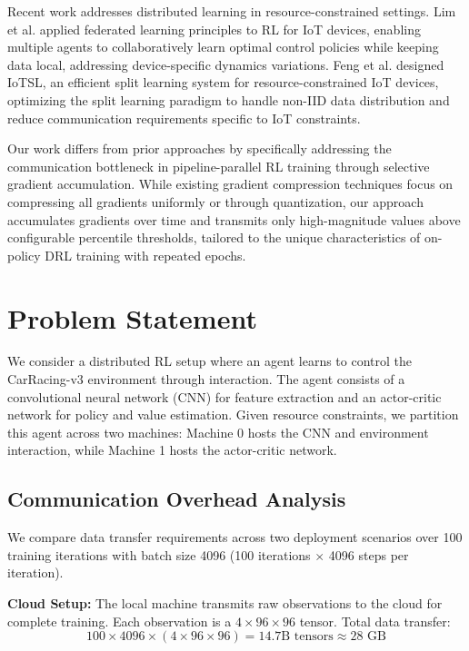 \documentclass[conference]{IEEEtran}
\begin{document}
Recent work addresses distributed learning in resource-constrained settings. Lim et al. \cite{lim2020} applied federated learning principles to RL for IoT devices, enabling multiple agents to collaboratively learn optimal control policies while keeping data local, addressing device-specific dynamics variations. Feng et al. \cite{feng2023} designed IoTSL, an efficient split learning system for resource-constrained IoT devices, optimizing the split learning paradigm to handle non-IID data distribution and reduce communication requirements specific to IoT constraints.

Our work differs from prior approaches by specifically addressing the communication bottleneck in pipeline-parallel RL training through selective gradient accumulation. While existing gradient compression techniques focus on compressing all gradients uniformly or through quantization, our approach accumulates gradients over time and transmits only high-magnitude values above configurable percentile thresholds, tailored to the unique characteristics of on-policy DRL training with repeated epochs.

\section{Problem Statement}

We consider a distributed RL setup where an agent learns to control the CarRacing-v3 environment through interaction. The agent consists of a convolutional neural network (CNN) for feature extraction and an actor-critic network for policy and value estimation. Given resource constraints, we partition this agent across two machines: Machine 0 hosts the CNN and environment interaction, while Machine 1 hosts the actor-critic network.

\subsection{Communication Overhead Analysis}

We compare data transfer requirements across two deployment scenarios over 100 training iterations with batch size 4096 (100 iterations $\times$ 4096 steps per iteration).

\textbf{Cloud Setup:} The local machine transmits raw observations to the cloud for complete training. Each observation is a $4 \times 96 \times 96$ tensor. Total data transfer:
\begin{equation}
100 \times 4096 \times (4 \times 96 \times 96) = 14.7\text{B tensors} \approx 28\text{ GB}
\end{equation}
\end{document}
